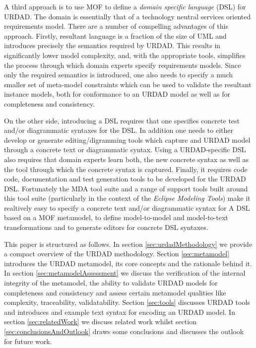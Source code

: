 A third approach is to use MOF to define a {\em domain specific language} (DSL) for URDAD. The domain is essentially that of a technology neutral services oriented requirements model. There are a number of compelling advantages of this approach. Firstly, resultant language is a fraction of the size of UML and introduces precisely the semantics required by URDAD. This results in significantly lower model complexity, and, with the appropriate tools, simplifies the process through which domain experts specify requirements models. Since only the required semantics is introduced, one also needs to specify a much smaller set of meta-model constraints which can be used to validate the resultant instance models, both for conformance to an URDAD model as well as for completeness and consistency.

On the other side, introducing a DSL requires that one specifies concrete test and/or diagrammatic syntaxes for the DSL. In addition one needs to either develop or generate editing/digramming tools which capture and URDAD model through a concrete text or diagrammatic syntax. Using a URDAD-specific DSL also requires that domain experts learn both, the new concrete syntax as well as the tool through which the concrete syntax is captured. Finally, it requires code code, documentation and test generation tools to be developed for the URDAD DSL. Fortunately the MDA tool suite and a range of support tools built around this tool suite (particularly in the context of the {\em Eclipse Modeling Tools}) make it realtively easy to specify a concrete text and/or diagrammatic syntax for A DSL based on a MOF metamodel, to define model-to-model and model-to-text transformations and to generate editors for concrete DSL syntaxes.

This paper is structured as follows. In section \ref{sec:urdadMethodology} we provide a compact overview of the URDAD methodology. Section \ref{sec:metamodel} introduces the URDAD metamodel, its core concepts and the rationale behind it. In section \ref{sec:metamodelAssessment} we discuss the verification of the internal integrity of the metamodel, the ability to validate URDAD models for completeness and consistency and assess certain metamodel qualities like complexity, traceability, validatability. Section \ref{sec:tools} discusses URDAD tools and introduces and example text syntax for encoding an URDAD model. In section \ref{sec:relatedWork} we discuss related work whilst section \ref{sec:conclusionsAndOutlook} draws some conclusions and discusses the outlook for future work.

